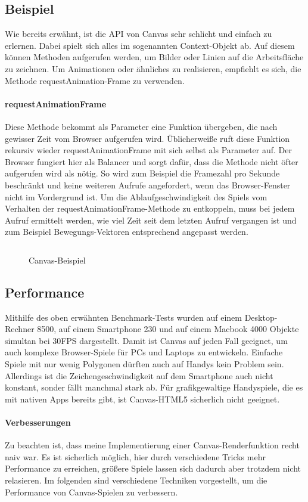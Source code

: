 \documentclass[a4paper, 12pt]{article}
\begin{document}
\subsection{Beispiel}
Wie bereits erwähnt, ist die API von Canvas sehr schlicht und einfach zu erlernen. Dabei spielt sich alles im sogenannten Context-Objekt ab. Auf diesem können Methoden aufgerufen werden, um Bilder oder Linien auf  die Arbeitsfläche zu zeichnen. Um Animationen oder ähnliches zu realisieren, empfiehlt es sich, die Methode requestAnimation-Frame zu verwenden.
\paragraph{requestAnimationFrame} Diese Methode bekommt als Parameter eine Funktion übergeben, die nach gewisser Zeit vom Browser aufgerufen wird. Üblicherweiße ruft diese Funktion rekursiv wieder requestAnimationFrame mit sich selbst als Parameter auf. Der Browser fungiert hier als Balancer und sorgt dafür, dass die Methode nicht öfter aufgerufen wird als nötig. So wird zum Beispiel die Framezahl pro Sekunde beschränkt und keine weiteren Aufrufe angefordert, wenn das Browser-Fenster nicht im Vordergrund ist. Um die Ablaufgeschwindigkeit des Spiels vom Verhalten der requestAnimationFrame-Methode zu entkoppeln, muss bei jedem Aufruf ermittelt werden, wie viel Zeit seit dem letzten Aufruf vergangen ist und zum Beispiel Bewegungs-Vektoren entsprechend angepasst werden.
\begin{figure}[H]
	\inputminted{javascript}{assets/vanillacanvas_example.js}
	\caption{Canvas-Beispiel}
	\label{canvas_support2}
\end{figure}
\subsection{Performance}
Mithilfe des oben erwähnten Benchmark-Tests wurden auf einem Desktop-Rechner 8500, auf einem Smartphone 230 und auf einem Macbook 4000 Objekte simultan bei 30FPS dargestellt. Damit ist Canvas auf jeden Fall geeignet, um auch komplexe Browser-Spiele für PCs und Laptops zu entwickeln. Einfache Spiele mit nur wenig Polygonen dürften auch auf Handys kein Problem sein. Allerdings ist die Zeichengeschwindigkeit auf dem Smartphone auch nicht konstant, sonder fällt manchmal stark ab. Für grafikgewaltige Handyspiele, die es mit nativen Apps bereits gibt, ist Canvas-HTML5 sicherlich nicht geeignet.
\paragraph{Verbesserungen} Zu beachten ist, dass meine Implementierung einer Canvas-Renderfunktion recht naiv war. Es ist sicherlich möglich, hier durch verschiedene Tricks mehr Performance zu erreichen, größere Spiele lassen sich dadurch aber trotzdem nicht relasieren. Im folgenden sind verschiedene Techniken vorgestellt, um die Performance von Canvas-Spielen zu verbessern.
\end{document}
